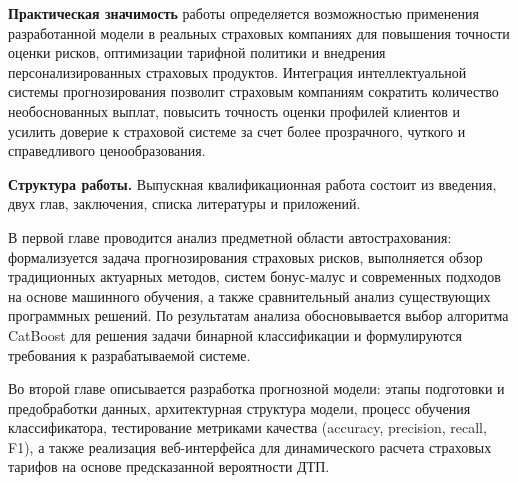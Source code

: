 \textbf{Практическая значимость} работы определяется возможностью применения разработанной модели в реальных страховых компаниях для повышения точности оценки рисков, оптимизации тарифной политики и внедрения персонализированных страховых продуктов. Интеграция интеллектуальной системы прогнозирования позволит страховым компаниям сократить количество необоснованных выплат, повысить точность оценки профилей клиентов и усилить доверие к страховой системе за счет более прозрачного, чуткого и справедливого ценообразования. 

\textbf{Структура работы.} Выпускная квалификационная работа состоит из введения, двух глав, заключения, списка литературы и приложений.


В первой главе проводится анализ предметной области автострахования: формализуется задача прогнозирования страховых рисков, выполняется обзор традиционных актуарных методов, систем бонус-малус и современных подходов на основе машинного обучения, а также сравнительный анализ существующих программных решений. По результатам анализа обосновывается выбор алгоритма CatBoost для решения задачи бинарной классификации и формулируются требования к разрабатываемой системе.

Во второй главе описывается разработка прогнозной модели: этапы подготовки и предобработки данных, архитектурная структура модели, процесс обучения классификатора, тестирование метриками качества (accuracy, precision, recall, F1), а также реализация веб-интерфейса для динамического расчета страховых тарифов на основе предсказанной вероятности ДТП.
